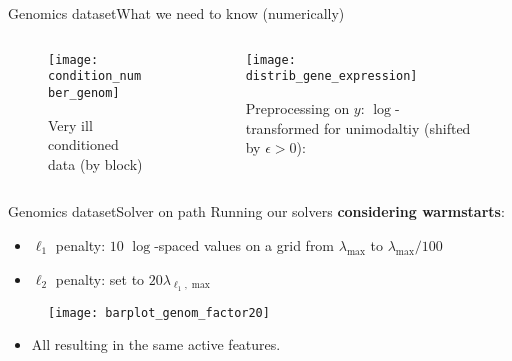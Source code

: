\documentclass[10pt,aspectratio=43]{beamer}
\begin{document}
\begin{frame}{Genomics dataset}{What we need to know (numerically)}
\begin{columns}
\begin{column}{.5\textwidth}
    \begin{figure}[h]
        \centering
        \texttt{[image: condition\_number\_genom]}
        \caption*{Very ill conditioned data (by block)
        }
    \end{figure}
\end{column}
\hfill
\begin{column}{.5\textwidth}
    \begin{figure}[h]
        \centering
        \texttt{[image: distrib\_gene\_expression]}
        \caption*{Preprocessing on $y$: $\log$-transformed for unimodaltiy
        (shifted by $\epsilon>0$):
        }
    \end{figure}
\end{column}
\end{columns}
\end{frame}
\begin{frame}{Genomics dataset}{Solver on path}
Running our solvers \textbf{considering warmstarts}:
\begin{itemize}
    \item $\ell_1$ penalty: $10$ $\log$-spaced values on a grid
    from $\lambda_{\max}$ to $\lambda_{\max}/100$
    \item $\ell_2$ penalty: set to $20\lambda_{\ell_1, \max}$
\end{itemize}
\begin{figure}[h]
    \centering
    \texttt{[image: barplot\_genom\_factor20]}
\end{figure}
\begin{itemize}
    \item All resulting in the same active features.
\end{itemize}
\end{frame}
\end{document}
